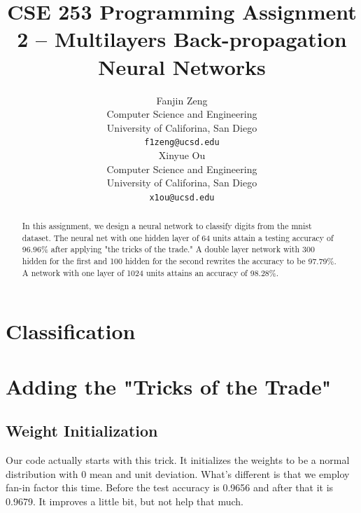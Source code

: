 \documentclass{article}
\title{CSE 253 Programming Assignment 2 -- Multilayers Back-propagation Neural Networks}
\author{
  Fanjin Zeng \\
  Computer Science and Engineering\\
  University of Califorina, San Diego\\
  \texttt{f1zeng@ucsd.edu} \\
   \And
   Xinyue Ou \\
   Computer Science and Engineering\\
   University of Califorina, San Diego \\
   \texttt{x1ou@ucsd.edu} \\
}
\begin{document}
\maketitle
\begin{abstract}
	In this assignment, we design a neural network to classify digits from the mnist dataset. The neural net with one hidden layer of 64 units attain a testing accuracy of 96.96\% after applying "the tricks of the trade." A double layer network with 300 hidden for the first and 100 hidden for the second rewrites the accuracy to be 97.79\%. A network with one layer of 1024 units attains an accuracy of 98.28\%.
\end{abstract}
\section{Classification}
\subsection{}
\subsection{}
\subsection{}
\subsection{}

\newpage
\section{Adding the "Tricks of the Trade"}
\subsection{}
\subsection{}
\subsection{Weight Initialization}
Our code actually starts with this trick. It initializes the weights to be a normal distribution with 0 mean and unit deviation. What's different is that we employ fan-in factor this time. Before the test accuracy is 0.9656 and after that it is 0.9679. It improves a little bit, but not help that much.
\end{document}
